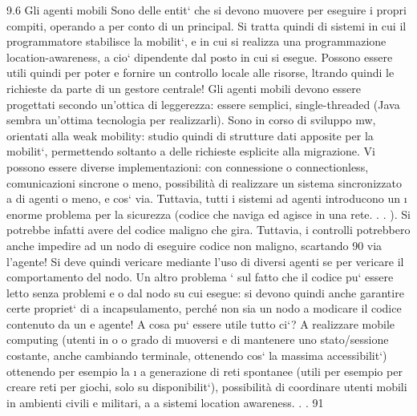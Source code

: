 \documentclass[a4paper,12pt]{article}
\begin{document}
9.6
Gli agenti mobili
Sono delle entit` che si devono muovere per eseguire i propri compiti, operando
a
per conto di un principal. Si tratta quindi di sistemi in cui il programmatore stabilisce la mobilit`, e in cui si
realizza una programmazione location-awareness,
a
cio` dipendente dal posto in cui si esegue. Possono essere utili quindi per poter
e
fornire un controllo locale alle risorse, ltrando quindi le richieste da parte di un
gestore centrale! Gli agenti mobili devono essere progettati secondo un'ottica di
leggerezza: essere semplici, single-threaded (Java sembra un'ottima tecnologia
per realizzarli). Sono in corso di sviluppo mw, orientati alla weak mobility:
studio quindi di strutture dati apposite per la mobilit`, permettendo soltanto
a
delle richieste esplicite alla migrazione.
Vi possono essere diverse implementazioni: con connessione o connectionless,
comunicazioni sincrone o meno, possibilità di realizzare un sistema sincronizzato
a
di agenti o meno, e cos` via. Tuttavia, tutti i sistemi ad agenti introducono un
\i{}
enorme problema per la sicurezza (codice che naviga ed agisce in una rete. . . ). Si
potrebbe infatti avere del codice maligno che gira. Tuttavia, i controlli potrebbero anche impedire ad un nodo di
eseguire codice non maligno, scartando
90
via l'agente! Si deve quindi vericare mediante l'uso di diversi agenti se per
vericare il comportamento del nodo.
Un altro problema ` sul fatto che il codice pu` essere letto senza problemi
e
o
dal nodo su cui esegue: si devono quindi anche garantire certe propriet` di
a
incapsulamento, perché non sia un nodo a modicare il codice contenuto da un
e
agente!
A cosa pu` essere utile tutto ci`? A realizzare mobile computing (utenti in
o
o
grado di muoversi e di mantenere uno stato/sessione costante, anche cambiando
terminale, ottenendo cos` la massima accessibilit`) ottenendo per esempio la
\i{}
a
generazione di reti spontanee (utili per esempio per creare reti per giochi, solo su
disponibilit`), possibilità di coordinare utenti mobili in ambienti civili e militari,
a
a
sistemi location awareness. . .
91
\end{document}
